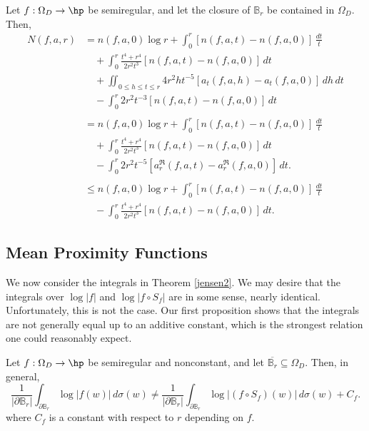 \documentclass{amsart}
\begin{document}
\begin{prop}
    Let $f:\Omega_D\to\hp$ be semiregular, and let the closure of $\mathbb B_r$ be contained in $\Omega_D$. Then, \begin{align*}
        N(f,a,r)&=n(f,a,0)\log r+\int_0^r [n(f,a,t)-n(f,a,0)]\,\frac{dt}{t} \\
        &\quad + \int_0^r \frac{t^4+r^4}{2r^2t^3}[n(f,a,t)-n(f,a,0)]\,dt \\ 
        &\quad +\iint_{0\leq h\leq t\leq r} 4r^2ht^{-5}[a_t(f,a,h)-a_t(f,a,0)]\, dh\, dt \\
        &\quad -\int_0^r 2r^2t^{-3}[n(f,a,t)-n(f,a,0)]\,dt \\\\
        &=n(f,a,0)\log r+\int_0^r [n(f,a,t)-n(f,a,0)]\,\frac{dt}{t} \\
        &\quad +\int_0^r \frac{t^4+r^4}{2r^2t^3}[n(f,a,t)-n(f,a,0)]\,dt \\
        &\quad -\int_0^r2r^2t^{-5}[a_r^\Re(f,a,t)-a_r^\Re(f,a,0)]\,dt.
        \\\\
        &\leq n(f,a,0)\log r+\int_0^r [n(f,a,t)-n(f,a,0)]\,\frac{dt}{t} \\
        &\quad - \int_0^r \frac{t^4+r^4}{2r^2t^3}[n(f,a,t)-n(f,a,0)]\,dt. 
    \end{align*}
\end{prop}

\subsection{Mean Proximity Functions}
We now consider the integrals in Theorem \ref{jensen2}. We may desire that the integrals over $\log|f|$ and $\log|f\circ S_f|$ are in some sense, nearly identical. Unfortunately, this is not the case. Our first proposition shows that the integrals are not generally equal up to an additive constant, which is the strongest relation one could reasonably expect. 

\begin{prop}\label{mIntC_fProp}
   Let $f:\Omega_D\to \hp $ be semiregular and nonconstant, and let $\overline{\mathbb B_r}\subseteq \Omega_D$. Then, in general, \[\frac{1}{|\partial \mathbb B_r|}\int_{\partial \mathbb B_r}\log|f(w)|\,d\sigma(w)\neq \frac{1}{|\partial \mathbb B_r|}\int_{\partial \mathbb B_r}\log |(f\circ S_f)(w)|\,d\sigma(w)+C_f.\] where $C_f$ is a constant with respect to $r$ depending on $f$. 
   \end{prop}
   
\end{document}

